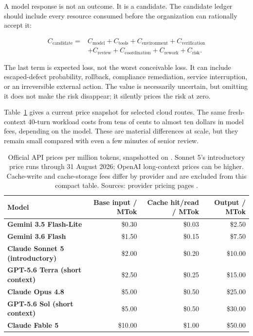 \documentclass[11pt]{article}
\begin{document}
A model response is not an outcome. It is a candidate. The candidate ledger should include every resource consumed before the organization can rationally accept it:

\begin{equation}
\begin{split}
C_{\mathrm{candidate}} ={}& C_{\mathrm{model}} + C_{\mathrm{tools}} + C_{\mathrm{environment}} + C_{\mathrm{verification}} \\
&+ C_{\mathrm{review}} + C_{\mathrm{coordination}} + C_{\mathrm{rework}} + C_{\mathrm{risk}}.
\end{split}
\label{eq:candidate-ledger}
\end{equation}

The last term is expected loss, not the worst conceivable loss. It can include escaped-defect probability, rollback, compliance remediation, service interruption, or an irreversible external action. The value is necessarily uncertain, but omitting it does not make the risk disappear; it silently prices the risk at zero.

Table~\ref{tab:price-snapshot} gives a current price snapshot for selected cloud routes. The same fresh-context 40-turn workload costs from tens of cents to almost ten dollars in model fees, depending on the model. These are material differences at scale, but they remain small compared with even a few minutes of senior review.

\begin{table}[htbp]
\centering
\small
\begin{tabularx}{\textwidth}{>{\bfseries}X r r r}
\toprule
Model & Base input / MTok & Cache hit/read / MTok & Output / MTok \\
\midrule
Gemini 3.5 Flash-Lite & \$0.30 & \$0.03 & \$2.50 \\
Gemini 3.6 Flash & \$1.50 & \$0.15 & \$7.50 \\
Claude Sonnet 5 (introductory) & \$2.00 & \$0.20 & \$10.00 \\
GPT-5.6 Terra (short context) & \$2.50 & \$0.25 & \$15.00 \\
Claude Opus 4.8 & \$5.00 & \$0.50 & \$25.00 \\
GPT-5.6 Sol (short context) & \$5.00 & \$0.50 & \$30.00 \\
Claude Fable 5 & \$10.00 & \$1.00 & \$50.00 \\
\bottomrule
\end{tabularx}
\caption{Official API prices per million tokens, snapshotted on \SnapshotDate{}. Sonnet 5's introductory price runs through 31 August 2026; OpenAI long-context prices can be higher. Cache-write and cache-storage fees differ by provider and are excluded from this compact table. Sources: provider pricing pages \cite{anthropicPricing,openaiPricing,googlePricing}.}
\label{tab:price-snapshot}
\end{table}
\end{document}
